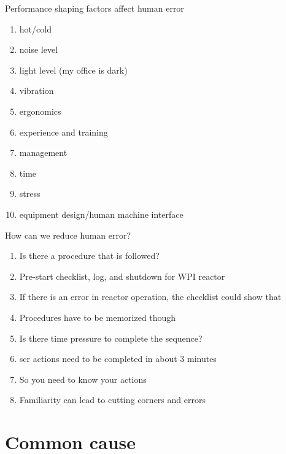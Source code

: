 \documentclass[aspectratio=1610,pdftex,dvipsnames,compress,xcolor={dvipsnames}]{beamer}
\newcommand{\acs}{\acrshort} %
\begin{document}
\begin{frame}{Performance shaping factors affect human error}
    \begin{enumerate}[series=outerlist,topsep=0pt,itemsep=3pt,leftmargin=*,label=(\arabic*)]
        \item[]hot/cold  
        \item[]noise level   
        \item[]light level (my office is dark)  
        \item[]vibration  
        \item[]ergonomics
        \item[]experience and training
        \item[]management
        \item[]time
        \item[]stress
        \item[]equipment design/human machine interface
    \end{enumerate}
\end{frame}


\begin{frame}{How can we reduce human error?}
    \begin{enumerate}[series=outerlist,topsep=0pt,itemsep=15pt,leftmargin=*,label=(\arabic*)]
        \item[]Is there a procedure that is followed?  
        \item[]Pre-start checklist, log, and shutdown for WPI reactor  
        \item[]If there is an error in reactor operation, the checklist could show that  
        \item[]Procedures have to be memorized though
        \item[]Is there time pressure to complete the sequence?  
        \item[]\acs{scr} actions need to be completed in about 3 minutes
        \item[]So you need to know your actions  
        \item[]Familiarity can lead to cutting corners and errors  
    \end{enumerate}
\end{frame}


\section{Common cause}
\end{document}
